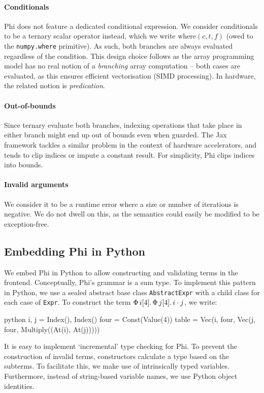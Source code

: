 \paragraph{Conditionals} Phi does not feature a dedicated conditional expression. We consider conditionals to be a ternary scalar operator instead, which we write $\mathrm{where}(c, t, f)$ (owed to the \texttt{numpy.where} primitive). As such, both branches are always evaluated regardless of the condition. This design choice follows as the array programming model has no real notion of a \textit{branching} array computation -- both cases are evaluated, as this ensures efficient vectorisation (SIMD processing). In hardware, the related notion is \textit{predication}.

\paragraph{Out-of-bounds} Since ternary evaluate both branches, indexing operations that take place in either branch might end up out of bounds even when guarded. 
The Jax framework tackles a similar problem in the context of hardware accelerators, 
and tends to clip indices or impute a constant result. 
For simplicity, Phi clips indices into bounds.

\paragraph{Invalid arguments} We consider it to be a runtime error where a size or number of iterations is negative. We do not dwell on this, as the semantics could easily be modified to be exception-free.

\subsection{Embedding Phi in Python}
\label{embedding-phi}

We embed Phi in Python to allow constructing and validating terms in the frontend. Conceptually, Phi's grammar is a sum type. To implement this pattern in Python, we use a sealed abstract base class \texttt{AbstractExpr} with a child class for each case of \texttt{Expr}. To construct the term $\Phi\, {i}[{4}] \ldotp {\Phi\, {j}[{4}] \ldotp {i \cdot j}}$, we write:
\begin{center}
\begin{cminted}{python}
i, j = Index(), Index()
four = Const(Value(4))
table = Vec(i, four, Vec(j, four, Multiply((At(i), At(j)))))
\end{cminted}
\end{center}
It is easy to implement `incremental' type checking for Phi. 
To prevent the construction of invalid terms, constructors calculate a type based on the subterms. To facilitate this, we make use of intrinsically typed variables. 
Furthermore, instead of string-based variable names, we use Python object identities.



